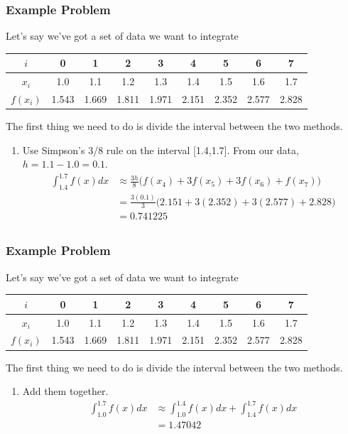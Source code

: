 \documentclass{if-beamer}
\begin{document}
\begin{frame}
	\frametitle{Example Problem}
	Let's say we've got a set of data we want to integrate
	\begin{table}
		\begin{tabular}{c| c c c c c c c c}
			$i$ &0& 1&2&3&4&5&6&7 \\
			\hline
			$x_i$& 1.0 &1.1&1.2&1.3&1.4&1.5&1.6&1.7\\
			$f(x_i)$&1.543&1.669&1.811&1.971&2.151&2.352&2.577&2.828\\
			
		\end{tabular}
	\end{table}
	The first thing we need to do is divide the interval between the two methods. \\\vspace{5pt}
	\begin{enumerate}[2]
		\item Use Simpson's 3/8 rule on the interval [1.4,1.7]. From our data, $h = 1.1-1.0 = 0.1$.
		\begin{align*}
		\int_{1.4}^{1.7}f(x)dx &\approx\frac{3h}{8}\bigg(f(x_4)+3f(x_5)+3f(x_6)+f(x_7)\bigg)\\
		&=\frac{3(0.1)}{3}\bigg(2.151+3(2.352)+3(2.577)+2.828\bigg)\\
		&=0.741225\\
		\end{align*}
	\end{enumerate}	
\end{frame}

\begin{frame}
	\frametitle{Example Problem}
	Let's say we've got a set of data we want to integrate
	\begin{table}
		\begin{tabular}{c| c c c c c c c c}
			$i$ &0& 1&2&3&4&5&6&7 \\
			\hline
			$x_i$& 1.0 &1.1&1.2&1.3&1.4&1.5&1.6&1.7\\
			$f(x_i)$&1.543&1.669&1.811&1.971&2.151&2.352&2.577&2.828\\
			
		\end{tabular}
	\end{table}
	The first thing we need to do is divide the interval between the two methods. \\\vspace{5pt}
	\begin{enumerate}[3]
		\item Add them together.
		\begin{align*}
		\int_{1.0}^{1.7}f(x)dx &\approx \int_{1.0}^{1.4}f(x)dx + \int_{1.4}^{1.7}f(x)dx\\
		&=1.47042\\
		\end{align*}
	\end{enumerate}	
\end{frame}
\end{document}
